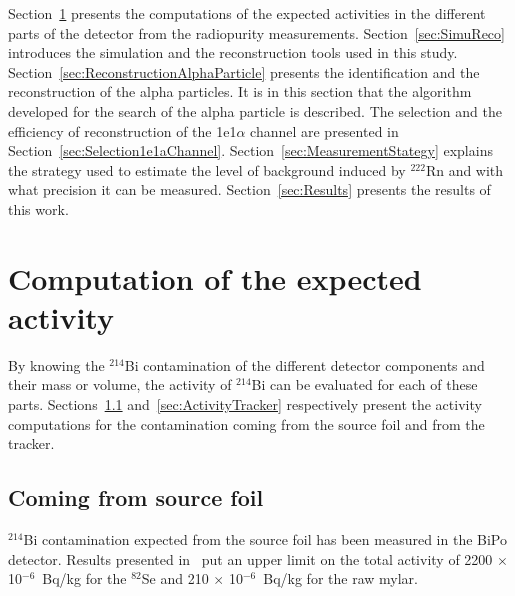 \documentclass[main.tex]{subfiles}
\begin{document}
\bigskip


\NI Section~\ref{sec:ActivityComputation} presents the computations of the expected activities in the different parts of the detector from the radiopurity measurements.  Section~\ref{sec:SimuReco} introduces the simulation and the reconstruction tools used in this study. Section~\ref{sec:ReconstructionAlphaParticle} presents the identification and the reconstruction of the alpha particles. It is in this section that the algorithm developed for the search of the alpha particle is described. The selection and the efficiency of reconstruction of the 1e1$\alpha$ channel are presented in Section~\ref{sec:Selection1e1aChannel}. Section~\ref{sec:MeasurementStategy} explains the strategy used to estimate the level of background induced by $^{\text{222}}$Rn and with what precision it can be measured. Section~\ref{sec:Results} presents the results of this work.


\FloatBarrier




\section{Computation of the expected activity}\label{sec:ActivityComputation}


\NI By knowing the $^{\text{214}}$Bi contamination of the different detector components and their mass or volume, the activity of $^{\text{214}}$Bi can be evaluated for each of these parts. Sections~\ref{sec:ActivitySourceFoil} and~\ref{sec:ActivityTracker} respectively present the activity computations for the contamination coming from the source foil and from the tracker.  


\subsection{Coming from source foil}\label{sec:ActivitySourceFoil}


\noindent $^{\text{214}}$Bi contamination expected from the source foil has been measured in the BiPo detector. Results presented in~\cite{BiPoResultsGomez,BiPoResultsLoaiza} put an upper limit on the total activity of 2200 $\times$ 10$^{-\text{6}}$~Bq/kg for the $^{\text{82}}$Se and 210 $\times$ 10$^{-\text{6}}$~Bq/kg for the raw mylar.  
\end{document}
